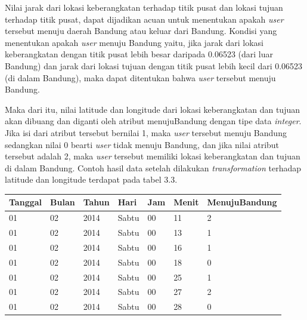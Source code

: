 Nilai jarak dari lokasi keberangkatan terhadap titik pusat dan lokasi tujuan terhadap titik pusat, dapat dijadikan acuan untuk menentukan apakah \textsl{user} tersebut menuju daerah Bandung atau keluar dari Bandung. Kondisi yang menentukan apakah \textsl{user} menuju Bandung yaitu, jika jarak dari lokasi keberangkatan dengan titik pusat lebih besar daripada 0.06523 (dari luar Bandung) dan jarak dari lokasi tujuan dengan titik pusat lebih kecil dari 0.06523 (di dalam Bandung), maka dapat ditentukan bahwa \textsl{user} tersebut menuju Bandung.

Maka dari itu, nilai latitude dan longitude dari lokasi keberangkatan dan tujuan akan dibuang dan diganti oleh atribut menujuBandung dengan tipe data \textsl{integer}. Jika isi dari atribut tersebut bernilai 1, maka \textsl{user} tersebut menuju Bandung sedangkan nilai 0 bearti \textsl{user} tidak menuju Bandung, dan jika nilai atribut tersebut adalah 2, maka \textsl{user} tersebut memiliki lokasi keberangkatan dan tujuan di dalam Bandung. Contoh hasil data setelah dilakukan \textsl{transformation} terhadap latitude dan longitude terdapat pada tabel 3.3.

\begin{table}[h]
\caption{Contoh hasil data transformasi latitude longitude}
\begin{longtable}{|l|l|l|l|l|l|l|}
\hline
\textbf{Tanggal}	& \textbf{Bulan}	& \textbf{Tahun} 	& \textbf{Hari} & \textbf{Jam}	& \textbf{Menit} & \textbf{MenujuBandung} \\ \hline
01				         	& 02								& 2014						& Sabtu         & 00         	& 11						 & 2                    \\ \hline
01				         	& 02								& 2014						& Sabtu         & 00         	& 13						 & 1        					  \\ \hline
01				          & 02								& 2014						& Sabtu         & 00         	& 16						 & 1       							\\ \hline
01				          & 02								& 2014						& Sabtu         & 00         	& 18						 & 0         						\\ \hline
01				          & 02								& 2014						& Sabtu         & 00         	& 25						 & 1          					\\ \hline
01				          & 02								& 2014						& Sabtu         & 00         	& 27						 & 2      							\\ \hline
01				          & 02								& 2014						& Sabtu         & 00         	& 28						 & 0       							\\ \hline
\end{longtable}
\end{table} 



